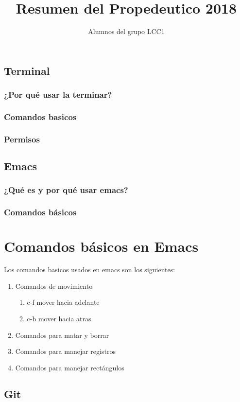 \documentclass[11pt,letterpaper]{article}
\title{Resumen del Propedeutico 2018}
\author{Alumnos del grupo LCC1}
\begin{document}
\maketitle
\section{Terminal}
\subsection{¿Por qué usar la terminar?}
\subsection{Comandos basicos}
\subsection{Permisos}
\section{Emacs}
\subsection{¿Qué es y por qué usar emacs?}
\subsection{Comandos básicos}
\setcounter{ćhapter}{5} 
\chapter {Comandos básicos en Emacs}
Los comandos basicos usados en emacs son los siguientes:
\begin {enumerate}
\item Comandos de movimiento
  \begin {enumerate}
    \item c-f mover hacia adelante
    \item c-b mover hacia atras
   \end {enumerate}
\item Comandos para matar y borrar
\item Comandos para manejar registros
\item Comandos para manejar rectángulos
\end{enumerate}
\section{Git}
\end{document}
